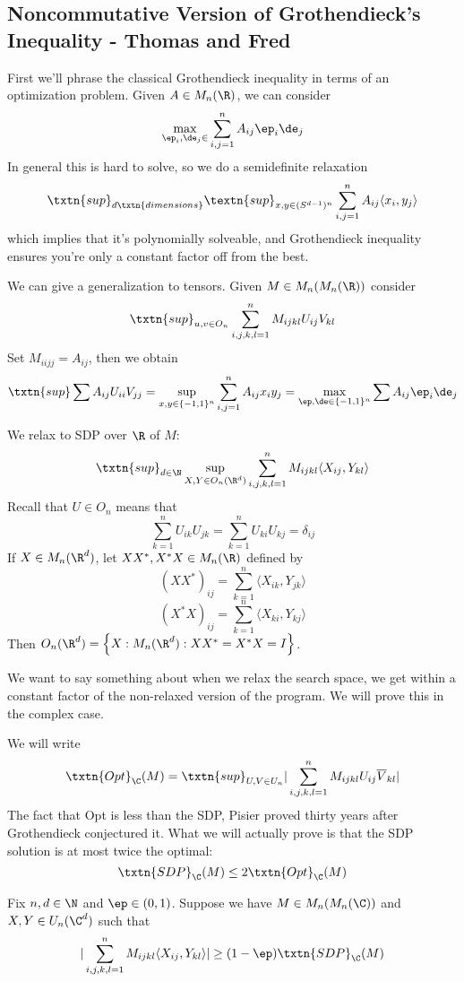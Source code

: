 \begin{df}
\section{Noncommutative Version of Grothendieck's Inequality - Thomas and Fred}

First we'll phrase the classical Grothendieck inequality in terms of an optimization problem. Given $A \in M_n(\R)$, we can consider 
\[
\max_{\ep_i, \de_j \in } \sum_{i, j = 1}^n A_{ij} \ep_i\de_j
\]
In general this is hard to solve, so we do a semidefinite relaxation
\[
\txtn{sup}_{d \txtn{ dimensions}} \textn{sup}_{x, y \in (S^{d - 1})^n}  \sum_{i, j = 1}^n A_{ij}\langle x_i, y_j \rangle
\]
which implies that it's polynomially solveable, and Grothendieck inequality ensures you're only a constant factor off from the best. 

We can give a generalization to tensors. Given $M \in M_n(M_n(\R))$ consider 
\[
\txtn{sup}_{u, v \in O_n} \sum_{i, j, k, l = 1}^n M_{ijkl} U_{ij}V_{kl}
\]
Set $M_{iijj} = A_{ij}$, then we obtain
\[
\txtn{sup} \sum A_{ij} U_{ii}V_{jj} = \sup_{x, y \in \{-1, 1\}^n} \sum_{i, j = 1}^n A_{ij}x_iy_j = \max_{\ep, \de \in \{-1, 1\}^n} \sum A_{ij} \ep_i \de_j
\]

We relax to SDP over $\R$ of $M$: 
\[
\txtn{sup}_{d \in \N} \sup_{X, Y \in O_n(\R^d)} \sum_{i, j, k, l = 1}^n M_{ijkl} \langle X_{ij}, Y_{kl} \rangle
\]
Recall that $U \in O_n$ means that 
\[
\sum_{k = 1}^n U_{ik} U_{jk} = \sum_{k = 1}^n U_{ki} U_{kj} = \delta_{ij}
\]
If $X \in M_n(\R^d)$, let $XX^*, X^*X \in M_n(\R)$ defined by 
\[
(XX^*)_{ij} = \sum_{k = 1}^n \langle X_{ik}, Y_{jk} \rangle
\]
\[
(X^*X)_{ij} = \sum_{k = 1}^n \langle X_{ki}, Y_{kj} \rangle
\]
Then $O_n(\R^d) = \left\{X: M_n(\R^d): XX^* = X^*X = I\right\}$.

We want to say something about when we relax the search space, we get within a constant factor of the non-relaxed version of the program. We will prove this in the complex case.

We will write 
\[
\txtn{Opt}_{\C}(M) = \txtn{sup}_{U, V \in U_n} |\sum_{i, j, k, l = 1}^n M_{ijkl} U_{ij} \overline{V}_{kl}|
\]
The fact that Opt is less than the SDP, Pisier proved thirty years after Grothendieck conjectured it. 
What we will actually prove is that the SDP solution is at most twice the optimal: 
\[
\txtn{SDP}_{\C}(M) \leq 2 \txtn{Opt}_{\C}(M)
\]

\begin{thm} Fix $n, d \in \N$ and $\ep \in (0, 1)$. Suppose we have $M \in M_n(M_n(\C))$ and $X, Y \in U_n(\C^d)$ such that 
\[
|\sum_{i, j, k , l = 1}^n M_{ijkl} \langle X_{ij}, Y_{kl} \rangle | \geq (1 - \ep) \txtn{SDP}_{\C}(M)
\]


\end{thm}
\end{df}
